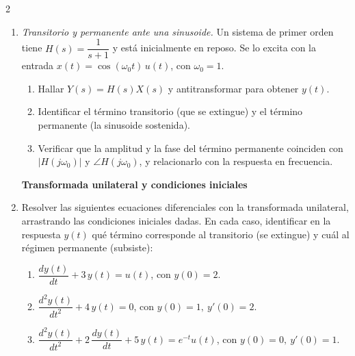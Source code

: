 \documentclass[10pt,a4paper]{article}
\begin{document}
\begin{multicols}{2}
\begin{enumerate}
			\item \emph{Transitorio y permanente ante una sinusoide.} Un sistema de primer orden tiene $H(s) = \dfrac{1}{s+1}$ y está inicialmente en reposo. Se lo excita con la entrada $x(t) = \cos(\omega_0 t)\,u(t)$, con $\omega_0 = 1$.
			\begin{enumerate}
				\item Hallar $Y(s) = H(s)X(s)$ y antitransformar para obtener $y(t)$.
				\item Identificar el término transitorio (que se extingue) y el término permanente (la sinusoide sostenida).
				\item Verificar que la amplitud y la fase del término permanente coinciden con $|H(j\omega_0)|$ y $\angle H(j\omega_0)$, y relacionarlo con la respuesta en frecuencia.
			\end{enumerate}

			\textbf{Transformada unilateral y condiciones iniciales}
			\item Resolver las siguientes ecuaciones diferenciales con la transformada unilateral, arrastrando las condiciones iniciales dadas. En cada caso, identificar en la respuesta $y(t)$ qué término corresponde al transitorio (se extingue) y cuál al régimen permanente (subsiste):
			\begin{enumerate}
				\item $\dfrac{dy(t)}{dt} + 3\,y(t) = u(t)$, \quad con $y(0) = 2$.
				\item $\dfrac{d^2y(t)}{dt^2} + 4\,y(t) = 0$, \quad con $y(0) = 1,\ y'(0) = 2$.
				\item $\dfrac{d^2y(t)}{dt^2} + 2\,\dfrac{dy(t)}{dt} + 5\,y(t) = e^{-t}u(t)$, \quad con $y(0) = 0,\ y'(0) = 1$.
			\end{enumerate}


\end{enumerate}
\end{multicols}
\end{document}

